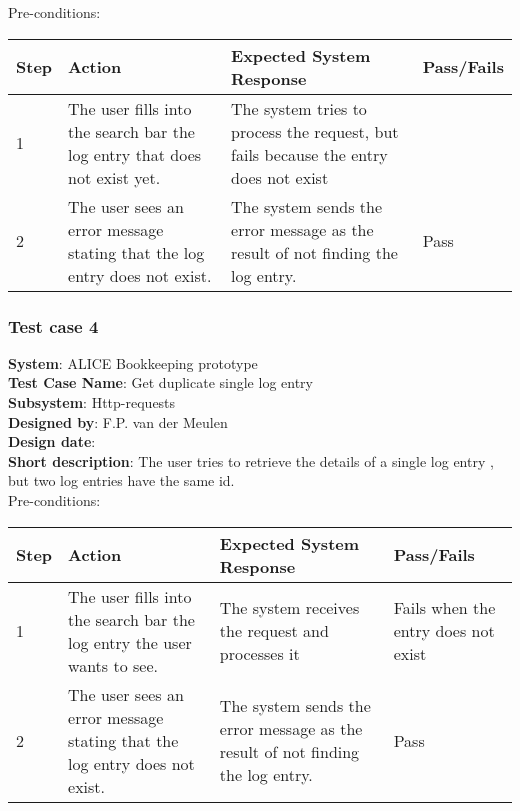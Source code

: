 Pre-conditions: \\

\begin{longtable}{ | p{0.8cm} | p{4.5cm} | p{6cm} | p{1.5cm} |}
\hline
Step & Action & Expected System Response & Pass/Fails  \\ \hline
1 & The user fills into the search bar the log entry that does not exist yet. & The system tries to process the request, but fails because the entry does not exist &   \\ \hline
2 & The user sees an error message stating that the log entry does not exist. & The system sends the error message as the result of not finding the log entry. & Pass \\ \hline

\end{longtable}

\subsubsection{Test case 4}
\textbf{System}:  ALICE Bookkeeping prototype \\
\textbf{Test Case Name}:  Get duplicate single log entry \\
\textbf{Subsystem}:  Http-requests \\
\textbf{Designed by}:  F.P. van der Meulen\\
\textbf{Design date}:  \\
\textbf{Short description}: The user tries to retrieve the details of a single log entry , but two log entries have the same id. \\

Pre-conditions: \\

\begin{longtable}{ | p{0.8cm} | p{4.5cm} | p{6cm} | p{1.5cm} |}
\hline
Step & Action & Expected System Response & Pass/Fails  \\ \hline
1 & The user fills into the search bar the log entry the user wants to see. & The system receives the request and processes it & Fails when the entry does not exist  \\ \hline
2 & The user sees an error message stating that the log entry does not exist. & The system sends the error message as the result of not finding the log entry. & Pass \\ \hline

\end{longtable}
